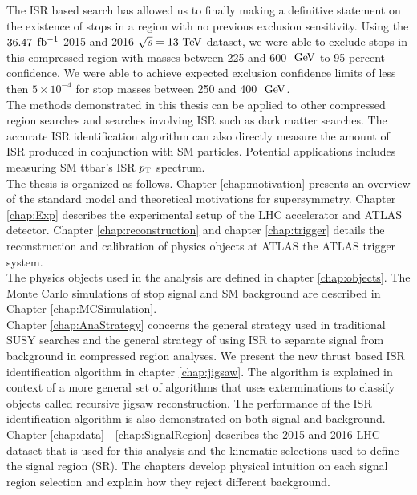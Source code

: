 \indent The ISR based search has allowed us to finally making a definitive statement on the existence of stops in a region with no previous exclusion sensitivity.  Using the $36.47$ $\mbox{fb$^{-1}$}$ 2015 and 2016 $\sqrt{s}=13 \tev$ dataset, we were able to exclude stops in this compressed region with masses between 225 and 600 $\gev$ to 95 percent confidence.  We were able to achieve expected exclusion confidence limits of less then $5 \times 10^{-4}$ for stop masses between 250 and 400 $\gev$.   \\

\indent The methods demonstrated in this thesis can be applied to other compressed region searches and searches involving ISR such as dark matter searches.  The accurate ISR identification algorithm can also directly measure the amount of ISR produced in conjunction with SM particles. Potential applications includes measuring SM ttbar's ISR $p_{\mathrm{T}}$ spectrum. \\

\indent The thesis is organized as follows.  Chapter \ref{chap:motivation} presents an overview of the standard model and theoretical motivations for supersymmetry.  Chapter \ref{chap:Exp} describes the experimental setup of the LHC accelerator and ATLAS detector.   Chapter \ref{chap:reconstruction} and chapter \ref{chap:trigger} details the reconstruction and calibration of physics objects at ATLAS the ATLAS trigger system.  \\

\indent The physics objects used in the analysis are defined in chapter \ref{chap:objects}.  The Monte Carlo simulations of stop signal and SM background are described in Chapter \ref{chap:MCSimulation}.  \\ 

\indent Chapter \ref{chap:AnaStrategy} concerns the general strategy used in traditional SUSY searches and the general strategy of using ISR to separate signal from background in compressed region analyses.  We present the new thrust based ISR identification algorithm in chapter \ref{chap:jigsaw}.  The algorithm is explained in context of a more general set of algorithms that uses exterminations to classify objects called recursive jigsaw reconstruction.  The performance of the ISR identification algorithm is also demonstrated on both signal and background. \\

\indent Chapter \ref{chap:data} - \ref{chap:SignalRegion} describes the 2015 and 2016 LHC dataset that is used for this analysis and the kinematic selections used to define the signal region (SR).  The chapters develop physical intuition on each signal region selection and explain how they reject different background.  \\

